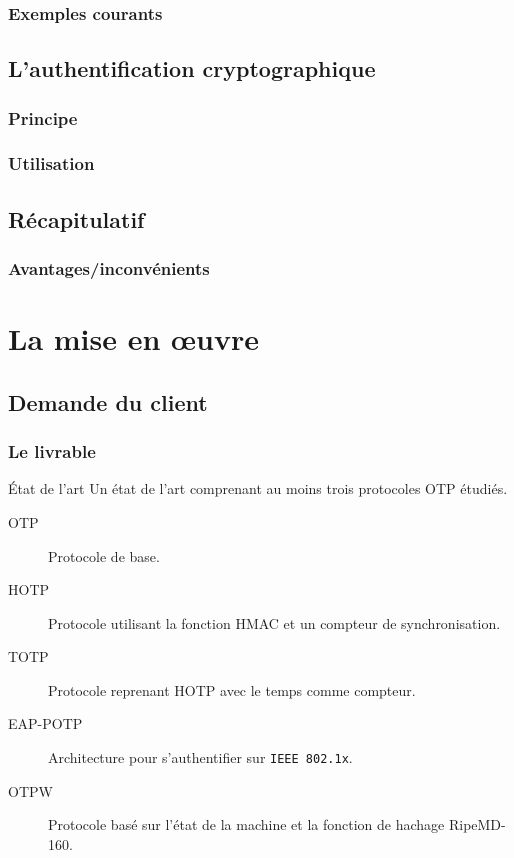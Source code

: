 \documentclass[xcolor=table]{beamer}
\begin{document}
\begin{frame}
\frametitle{Exemples courants}

\end{frame}

\subsection{L'authentification cryptographique}
\begin{frame}
\frametitle{Principe}
\end{frame}

\begin{frame}
\frametitle{Utilisation}
\end{frame}

\subsection{Récapitulatif}
\begin{frame}
\frametitle{Avantages/inconvénients}
\end{frame}


\section{La mise en œuvre}

\subsection{Demande du client}

\begin{frame}
\frametitle{Le livrable}
\begin{block}{État de l'art} 
Un état de l'art comprenant au moins trois protocoles OTP étudiés.
\begin{description}
 \item[OTP] Protocole de base.
 \item[HOTP] Protocole utilisant la fonction HMAC et un compteur de 
  synchronisation.
 \item[TOTP] Protocole reprenant HOTP avec le temps comme compteur.
 \item[EAP-POTP] Architecture pour s'authentifier sur \verb?IEEE 802.1x?. 
 \item[OTPW] Protocole basé sur l'état de la machine et la fonction de hachage RipeMD-160.
\end{description}
\end{block}
\end{frame}
\end{document}
